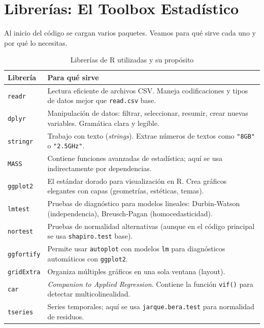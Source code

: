 \documentclass[12pt,a4paper]{article}
\begin{document}
\section{Librerías: El Toolbox Estadístico}

Al inicio del código se cargan varios paquetes. Veamos para qué sirve cada uno y por qué lo necesitas.

\begin{table}[H]
\centering
\caption{Librerías de R utilizadas y su propósito}
\begin{tabular}{lp{9cm}}
\toprule
\textbf{Librería} & \textbf{Para qué sirve} \\
\midrule
\texttt{readr} & Lectura eficiente de archivos CSV. Maneja codificaciones y tipos de datos mejor que \texttt{read.csv} base. \\
\texttt{dplyr} & Manipulación de datos: filtrar, seleccionar, resumir, crear nuevas variables. Gramática clara y legible. \\
\texttt{stringr} & Trabajo con texto (\textit{strings}). Extrae números de textos como \texttt{"8GB"} o \texttt{"2.5GHz"}. \\
\texttt{MASS} & Contiene funciones avanzadas de estadística; aquí se usa indirectamente por dependencias. \\
\texttt{ggplot2} & El estándar dorado para visualización en R. Crea gráficos elegantes con capas (geometrías, estéticas, temas). \\
\texttt{lmtest} & Pruebas de diagnóstico para modelos lineales: Durbin-Watson (independencia), Breusch-Pagan (homocedasticidad). \\
\texttt{nortest} & Pruebas de normalidad alternativas (aunque en el código principal se usa \texttt{shapiro.test} base). \\
\texttt{ggfortify} & Permite usar \texttt{autoplot} con modelos \texttt{lm} para diagnósticos automáticos con \texttt{ggplot2}. \\
\texttt{gridExtra} & Organiza múltiples gráficos en una sola ventana (layout). \\
\texttt{car} & \textit{Companion to Applied Regression}. Contiene la función \texttt{vif()} para detectar multicolinealidad. \\
\texttt{tseries} & Series temporales; aquí se usa \texttt{jarque.bera.test} para normalidad de residuos. \\
\bottomrule
\end{tabular}
\end{table}
\end{document}
